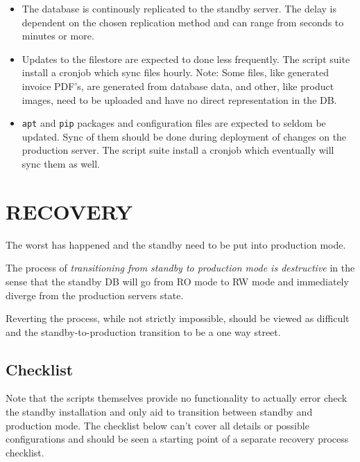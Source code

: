 \documentclass[a4paper]{article}
\begin{document}
	\begin{itemize}
		\item The database is continously replicated to the standby server. The delay is dependent on the chosen replication method and can range from seconds to minutes or more.
		\item Updates to the filestore are expected to done less frequently. The script suite install a cronjob which sync files hourly. Note: Some files, like generated invoice PDF's, are generated from database data, and other, like product images, need to be uploaded and have no direct representation in the DB.
		\item \texttt{apt} and \texttt{pip} packages and configuration files are expected to seldom be updated. Sync of them should be done during deployment of changes on the production server. The script suite install a cronjob which eventually will sync them as well.
	\end{itemize}

\newpage
\section{RECOVERY}
	The worst has happened and the standby need to be put into production mode.
	
	The process of \emph{transitioning from standby to production mode is destructive} in the sense that the standby DB will go from RO mode to RW mode and immediately diverge from the production servers state. 
	
	Reverting the process, while not strictly impossible, should be viewed as difficult and the standby-to-production transition to be a one way street.


	
\subsection{Checklist}
	Note that the scripts themselves provide no functionality to actually error check the standby installation and only aid to transition between standby and production mode. The checklist below can't cover all details or possible configurations and should be seen a starting point of a separate recovery process checklist. 
\end{document}
